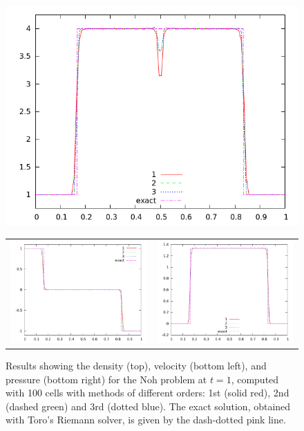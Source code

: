 \documentclass[10pt]{article}
\begin{document}
\begin{figure}[h]
  \begin{center}
     \includegraphics[width=.95\textwidth]{den_T4.png}	
	\begin{tabular}{cc}
      \includegraphics[width=.475\textwidth]{vel_T4.png} &
	  \includegraphics[width=.475\textwidth]{prs_T4.png}
	\end{tabular}
  \end{center}
  \caption{Results showing the density (top), velocity (bottom left), and pressure (bottom right) for the Noh problem at $t=1$, computed with 100 cells with methods of different orders: 1st (solid red), 2nd (dashed green) and 3rd (dotted blue). The exact solution, obtained with Toro's Riemann solver, is given by the dash-dotted pink line.}
  \label{fig:den_T4}
\end{figure}
\end{document}
